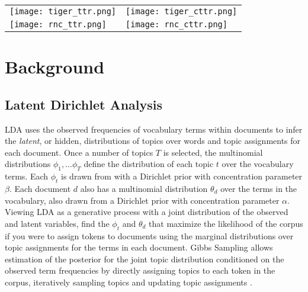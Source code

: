\documentclass[11pt,a4paper]{article}
\begin{document}
\begin{figure*}[t]
    \label{fig:treatment_strength}
    \begin{tabular}{ll}
        \texttt{[image: tiger\_ttr.png]} & \texttt{[image: tiger\_cttr.png]} \\
        \texttt{[image: rnc\_ttr.png]} & \texttt{[image: rnc\_cttr.png]}
    \end{tabular}
\end{figure*}




\section{Background}

\subsection{Latent Dirichlet Analysis}
LDA uses the observed frequencies of vocabulary terms within documents to infer the \textit{latent}, or hidden, distributions of topics over words and topic assignments for each document. Once a number of topics $T$ is selected, the multinomial distributions $\phi_1,...\phi_T$ define the distribution of each topic $t$ over the vocabulary terms. Each $\phi_t$ is drawn from with a Dirichlet prior with concentration parameter $\beta$. Each document $d$ also has a multinomial distribution $\theta_d$ over the terms in the vocabulary, also drawn from a Dirichlet prior with concentration parameter $\alpha$. Viewing LDA as a generative process with a joint distribution of the observed and latent variables, find the $\phi_t$ and $\theta_d$ that maximize the likelihood of the corpus if you were to assign tokens to documents using the marginal distributions over topic assignments for the terms in each document. Gibbs Sampling allows estimation of the posterior for the joint topic distribution conditioned on the observed term frequencies by directly assigning topics to each token in the corpus, iteratively sampling topics and updating topic assignments
 \cite{steyvers2007probabilistic, blei2003,schofield-mimno-2016-comparing}.
\end{document}
